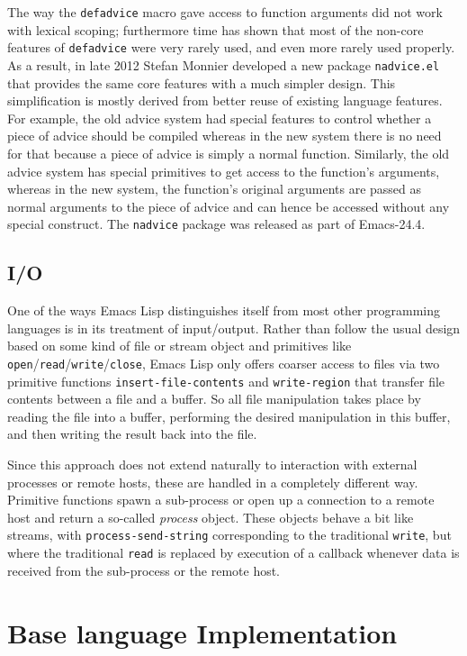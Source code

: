 \documentclass[format=acmsmall, review]{acmart}
\newcommand \Elisp {Emacs Lisp}
\begin{document}
The way the \texttt{defadvice} macro gave access to function arguments did
not work with lexical scoping; furthermore time has shown that most of the
non-core features of \texttt{defadvice} were very rarely used, and even more
rarely used properly.  As a result, in late 2012 Stefan Monnier developed a new
package \texttt{nadvice.el} that provides the same core features with a much
simpler design.  This simplification is mostly derived from better reuse of
existing language features.  For example, the old advice system had special
features to control whether a piece of advice should be compiled whereas in
the new system there is no need for that because a piece of
advice is simply a normal function.  Similarly, the old advice system
has special primitives to get access to the function's arguments,
whereas in the new system, the function's original arguments are passed as
normal arguments to the piece of advice and can hence be accessed without
any special construct.  The \texttt{nadvice} package was released as part of
Emacs-24.4.

\subsection{I/O}

One of the ways \Elisp{} distinguishes itself from most other programming
languages is in its treatment of input/output. Rather than follow the usual
design based on some kind of file or stream object and primitives like
\texttt{open}/\texttt{read}/\texttt{write}/\texttt{close}, \Elisp{} only
offers coarser access to files via two primitive functions
\texttt{insert-file-contents} and \texttt{write-region} that transfer file
contents between a file and a buffer.  So all file manipulation takes place
by reading the file into a buffer, performing the desired manipulation in
this buffer, and then writing the result back into the file.

Since this approach does not extend naturally to interaction with external
processes or remote hosts, these are handled in a completely different way.
Primitive functions spawn a sub-process or open up
a connection to a remote host and return a so-called \emph{process} object.
These objects behave  a bit like streams, with \texttt{process-send-string}
corresponding to the traditional \texttt{write}, but where the traditional
\texttt{read} is replaced by execution of a callback whenever data is
received from the sub-process or the remote host.

\section{Base language Implementation}
\label{sec:base-language-implementation}
\end{document}
